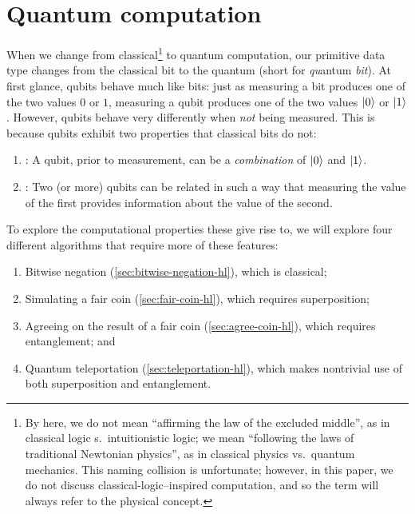 \documentclass[12pt]{amsart}
\begin{document}
\section{Quantum computation}\label{sec:quantum-computation}

When we change from classical\footnote{By  here, we do not mean
``affirming the law of the excluded middle'', as in classical logic
 s.\ intuitionistic logic; we mean ``following the laws of traditional Newtonian
physics'', as in classical physics vs.\ quantum mechanics.  This naming
collision is unfortunate; however, in this paper, we do not discuss
classical-logic--inspired computation, and so the term will always refer to the
physical concept.} to quantum computation,
our primitive data type changes from the classical bit to the quantum
 (short for \emph{qu}antum \emph{bit}).  At first glance, qubits
behave much like bits: just as measuring a bit produces one of the two values
$0$ or $1$, measuring a qubit produces one of the two values ${\left\vert{0}\right\rangle}$ or
${\left\vert{1}\right\rangle}$.  However, qubits behave very differently when \emph{not} being
measured.  This is because qubits exhibit two properties that classical bits do
not:
\begin{enumerate}
  \item {}: A qubit, prior to measurement, can be a
    \emph{combination} of ${\left\vert{0}\right\rangle}$ and ${\left\vert{1}\right\rangle}$.

  \item {}: Two (or more) qubits can be related in such a way
    that measuring the value of the first provides information about the value
    of the second.
\end{enumerate}

To explore the computational properties these give rise to, we will explore four
different algorithms that require more of these features:
\begin{enumerate}
  \item Bitwise negation (\cref{sec:bitwise-negation-hl}), which is classical;
  \item Simulating a fair coin (\cref{sec:fair-coin-hl}), which requires
    superposition;
  \item Agreeing on the result of a fair coin (\cref{sec:agree-coin-hl}), which
    requires entanglement; and
  \item Quantum teleportation (\cref{sec:teleportation-hl}), which makes
    nontrivial use of both superposition and entanglement.
\end{enumerate}
\end{document}
